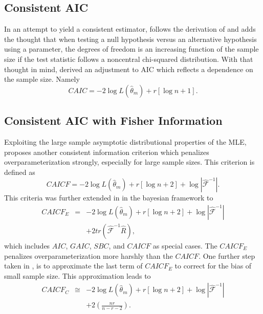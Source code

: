\subsection{Consistent AIC}

In an attempt to yield a consistent estimator, \citet{Bozd:1987}
follows the derivation of \citet{Akaike:1973} and adds the thought
that when testing a null hypothesis versus an alternative hypothesis
using a parameter, the degrees of freedom is an increasing function
of the sample size if the test statistic follows a noncentral chi-squared
distribution. With that thought in mind, \citet{Bozd:1987} derived
an adjustment to AIC which reflects a dependence on the sample size.
Namely
\begin{equation}
CAIC=-2\log L\left(\hat{\theta}_{m}\right)+r\left[\log n+1\right].\label{CAIC}
\end{equation}



\subsection{Consistent AIC with Fisher Information}

Exploiting the large sample asymptotic distributional properties of
the MLE, \citet{Bozd:1987} proposes another consistent information
criterion which penalizes overparameterization strongly, especially
for large sample sizes. This criterion is defined as
\begin{equation}
CAICF=-2\log L\left(\hat{\theta}_{m}\right)+r\left[\log n+2\right]+\log\left\vert \hat{\mathcal{F}}^{-1}\right\vert .\label{CAICF}
\end{equation}
This criteria was further extended in \citet{Bozd:Ueno:2000} in the
bayesian framework to
\begin{eqnarray}
CAICF_{E} & = & -2\log L\left(\hat{\theta}_{m}\right)+r\left[\log n+2\right]+\log\left\vert \hat{\mathcal{F}}^{-1}\right\vert \nonumber \\
 &  & +2tr\left(\hat{\mathcal{F}}^{-1}\hat{R}\right),\label{CAICF_E}
\end{eqnarray}
which includes $AIC$, $GAIC$, $SBC$, and $CAICF$ as special cases.
The $CAICF_{E}$ penalizes overparameterization more harshly than
the $CAICF$. One further step taken in \citet{Bozd:Ueno:2000}, is
to approximate the last term of $CAICF_{E}$ to correct for the bias
of small sample size. This approximation leads to
\begin{eqnarray}
CAICF_{C} & \cong & -2\log L\left(\hat{\theta}_{m}\right)+r\left[\log n+2\right]+\log\left\vert \hat{\mathcal{F}}^{-1}\right\vert \nonumber \\
 &  & +2\left(\frac{nr}{n-r-2}\right).\label{CAICF_C}
\end{eqnarray}



